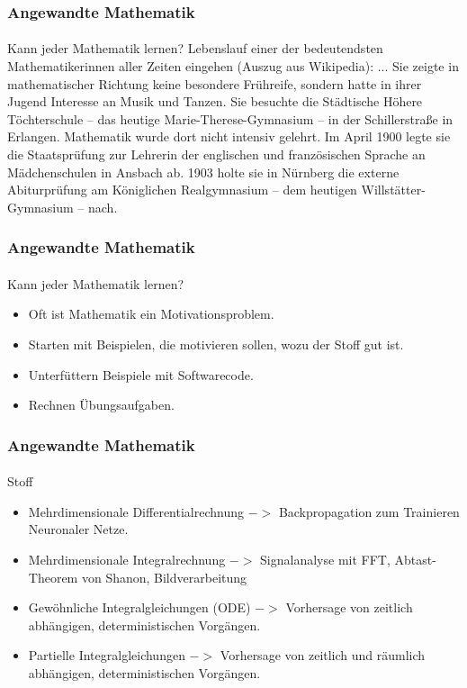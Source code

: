 \documentclass{beamer}
\begin{document}
\begin{frame}
    \frametitle{Angewandte Mathematik}
\framesubtitle{}
    \begin{block}{Kann jeder Mathematik lernen?}
 Lebenslauf einer der bedeutendsten Mathematikerinnen aller Zeiten eingehen  (Auszug aus Wikipedia):
... Sie zeigte in mathematischer Richtung keine besondere Frühreife, sondern hatte in ihrer Jugend Interesse an Musik und Tanzen. Sie besuchte die Städtische Höhere Töchterschule – das heutige Marie-Therese-Gymnasium – in der Schillerstraße in Erlangen. Mathematik wurde dort nicht intensiv gelehrt. Im April 1900 legte sie die Staatsprüfung zur Lehrerin der englischen und französischen Sprache an Mädchenschulen in Ansbach ab. 1903 holte sie in Nürnberg die externe Abiturprüfung am Königlichen Realgymnasium – dem heutigen Willstätter-Gymnasium – nach. 
\end{block}
 \end{frame}


\begin{frame}
    \frametitle{Angewandte Mathematik}
\framesubtitle{}
    \begin{block}{Kann jeder Mathematik lernen?}
\begin{itemize}
\pause \item Oft ist Mathematik ein Motivationsproblem.
\pause \item Starten mit  Beispielen, die motivieren sollen, wozu der Stoff gut ist.
\pause \item Unterfüttern Beispiele mit  Softwarecode. 
\pause \item Rechnen Übungsaufgaben.
\end{itemize}
\end{block}

 \end{frame}


\begin{frame}
    \frametitle{Angewandte Mathematik}
\framesubtitle{}
    \begin{block}{Stoff}
\begin{itemize}
\pause \item Mehrdimensionale Differentialrechnung $->$ Backpropagation zum Trainieren Neuronaler Netze.
\pause \item Mehrdimensionale Integralrechnung $->$ Signalanalyse mit FFT, Abtast-Theorem von Shanon, Bildverarbeitung
\pause \item Gewöhnliche Integralgleichungen (ODE) $->$ Vorhersage von zeitlich abhängigen, deterministischen Vorgängen.
\pause \item Partielle Integralgleichungen $->$ Vorhersage von zeitlich und räumlich abhängigen, deterministischen Vorgängen.
\end{itemize}
\end{block}

 \end{frame}
\end{document}
